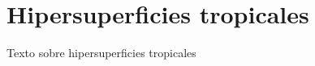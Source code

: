 \section{Hipersuperficies tropicales}
\label{sec:hipersuperficies-tropicales}
Texto sobre hipersuperficies tropicales
